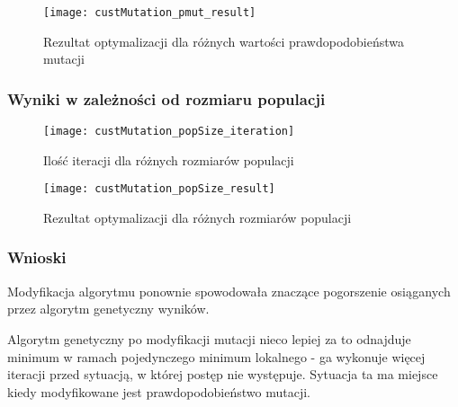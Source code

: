 \begin{figure}[H]
	\centering
	\texttt{[image: custMutation\_pmut\_result]}
	\caption{Rezultat optymalizacji dla różnych wartości prawdopodobieństwa mutacji}
\end{figure}

\subsubsection{Wyniki w zależności od rozmiaru populacji}

\begin{figure}[H]
	\centering
	\texttt{[image: custMutation\_popSize\_iteration]}
	\caption{Ilość iteracji  dla różnych rozmiarów populacji}
\end{figure}

\begin{figure}[H]
	\centering
	\texttt{[image: custMutation\_popSize\_result]}
	\caption{Rezultat optymalizacji  dla różnych rozmiarów populacji}
\end{figure}

\subsubsection{Wnioski}

Modyfikacja algorytmu ponownie spowodowała znaczące pogorszenie osiąganych przez algorytm genetyczny wyników.

Algorytm genetyczny po modyfikacji mutacji nieco lepiej za to odnajduje minimum w ramach pojedynczego minimum lokalnego - ga wykonuje więcej iteracji
przed sytuacją, w której postęp nie występuje.
Sytuacja ta ma miejsce kiedy modyfikowane jest prawdopodobieństwo mutacji.

